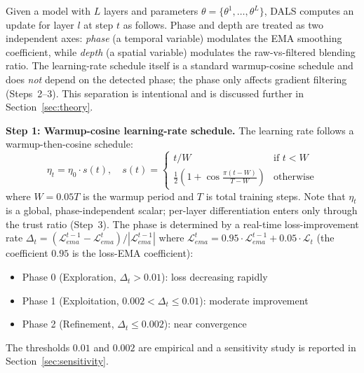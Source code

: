 \documentclass[a4paper,fleqn]{cas-dc}
\begin{document}
Given a model with $L$ layers and parameters $\theta = \{\theta^1, \ldots, \theta^L\}$, DALS computes an update for layer $l$ at step $t$ as follows. Phase and depth are treated as two independent axes: \emph{phase} (a temporal variable) modulates the EMA smoothing coefficient, while \emph{depth} (a spatial variable) modulates the raw-vs-filtered blending ratio. The learning-rate schedule itself is a standard warmup-cosine schedule and does \emph{not} depend on the detected phase; the phase only affects gradient filtering (Steps~2--3). This separation is intentional and is discussed further in Section~\ref{sec:theory}.

\textbf{Step 1: Warmup-cosine learning-rate schedule.} The learning rate follows a warmup-then-cosine schedule:
\begin{equation}\label{eq:dals_lr}
\eta_t = \eta_0 \cdot s(t), \quad s(t) = \begin{cases} t / W & \text{if } t < W \\ \frac{1}{2}\left(1 + \cos\frac{\pi(t - W)}{T - W}\right) & \text{otherwise} \end{cases}
\end{equation}
where $W = 0.05T$ is the warmup period and $T$ is total training steps. Note that $\eta_t$ is a global, phase-independent scalar; per-layer differentiation enters only through the trust ratio (Step~3). The phase is determined by a real-time loss-improvement rate $\Delta_t = (\mathcal{L}_{ema}^{t-1} - \mathcal{L}_{ema}^t) / |\mathcal{L}_{ema}^{t-1}|$ where $\mathcal{L}_{ema}^t = 0.95 \cdot \mathcal{L}_{ema}^{t-1} + 0.05 \cdot \mathcal{L}_t$ (the coefficient $0.95$ is the loss-EMA coefficient):
\begin{itemize}
\item Phase 0 (Exploration, $\Delta_t > 0.01$): loss decreasing rapidly
\item Phase 1 (Exploitation, $0.002 < \Delta_t \leq 0.01$): moderate improvement
\item Phase 2 (Refinement, $\Delta_t \leq 0.002$): near convergence
\end{itemize}
The thresholds $0.01$ and $0.002$ are empirical and a sensitivity study is reported in Section~\ref{sec:sensitivity}.
\end{document}
